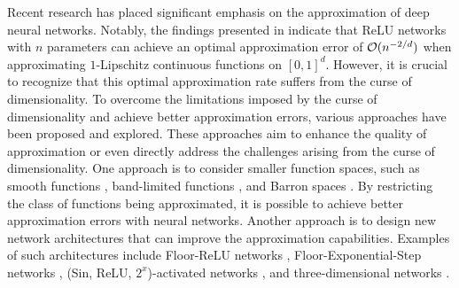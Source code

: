 \documentclass[nohyperref]{article}
\theoremstyle{plain}
\theoremstyle{definition}
\theoremstyle{remark}
\begin{document}
Recent research has placed significant emphasis on the approximation of deep neural networks. 
Notably, the findings presented in \cite{shijun:2, yarotsky18a, shijun:thesis} indicate that ReLU networks with $n$ parameters can achieve an optimal approximation error of ${\mathcal{O}}(n^{-2/d})$ when approximating $1$-Lipschitz continuous functions on $[0,1]^d$.
However, it is crucial to recognize that this optimal approximation rate suffers from the curse of dimensionality. 
To overcome the limitations imposed by the curse of dimensionality and achieve better approximation errors, various approaches have been proposed and explored. These approaches aim to enhance the quality of approximation or even directly address the challenges arising from the curse of dimensionality.
One approach is to consider smaller function spaces, such as smooth functions \cite{shijun:3,yarotsky:2019:06}, band-limited functions \cite{bandlimit}, and Barron spaces \cite{barron2018approximation,barron1993,2019arXiv190608039E}. By restricting the class of functions being approximated, it is possible to achieve better approximation errors with neural networks.
Another approach is to design new network architectures that can improve the approximation capabilities. Examples of such architectures include Floor-ReLU networks \cite{shijun:4}, Floor-Exponential-Step networks \cite{shijun:5}, (Sin, ReLU, $2^x$)-activated networks \cite{jiao2021deep}, and three-dimensional networks \cite{shijun:net:arc:beyond:width:depth}.
\end{document}
